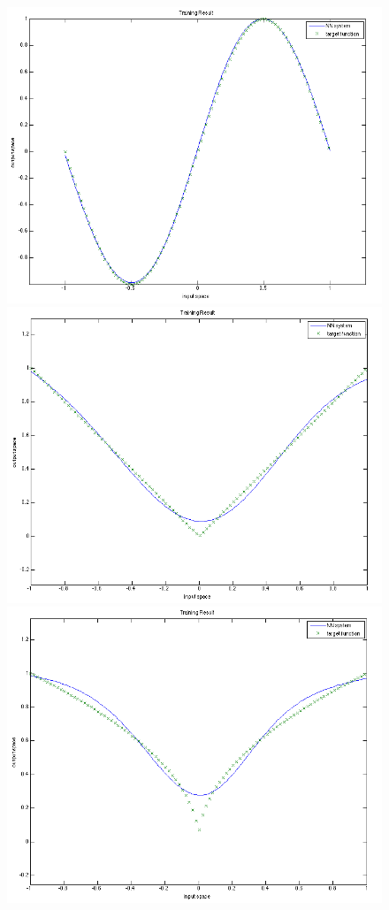\documentclass[12pt]{article}
\begin{document}
\begin{enumerate}
\begin{figure}[ht]
		\includegraphics[scale=.19]{../res/result_sin_nN5.png}
		\hspace*{-1em}
		\includegraphics[scale=.19]{../res/result_abs_nN5.png}
		\hspace*{-1em}
		\includegraphics[scale=.19]{../res/result_abs_sqrt_nN5.png}

\end{figure}
\end{enumerate}
\end{document}
